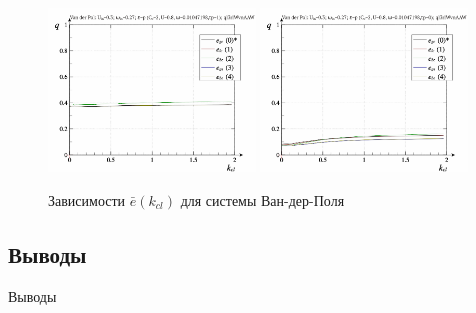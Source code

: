 \begin{figure}[ht!]
\begin{center}
  \includegraphics[width=0.49\textwidth]{p/cha/vdp/vdp_id-p_k_cl_sign.png}
  \hfill
  \includegraphics[width=0.49\textwidth]{p/cha/vdp/vdp_id-p_k_cl_sin.png}
\end{center}
  \caption{Зависимости $\bar{e}(k_{cl})$ для системы Ван-дер-Поля}
\label{atu:f:vdp_e_k_cl}
\end{figure}


\subsection{Выводы}  %

Выводы





